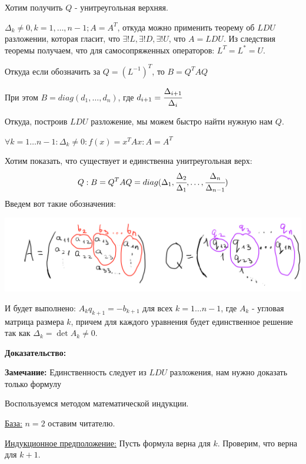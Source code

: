 
Хотим получить $Q$ - унитреугольная верхняя.

$\Delta_k \neq 0 , k = 1,\ldots, n-1; A= A^T$, откуда можно применить теорему об $LDU$ разложении, которая гласит, что $\exists! L, \exists! D, \exists! U$, что $A = LDU$. Из следствия теоремы получаем, что для самосопряженных операторов: $L^T=L^* = U$.

Откуда если обозначить за $Q = (L^{-1})^T$, то $B = Q^T AQ$

При этом  $B = diag(d_1,\ldots,d_n)$, где $d_{i+1} = \cfrac{\Delta_{i+1}}{\Delta_i}$

Откуда, построив $LDU$ разложение, мы можем быстро найти нужную нам $Q$.



$\forall k = 1 \ldots n-1: \Delta_k\neq 0 : f(x) = x^TAx: A = A^T$

Хотим показать, что существует и единственна унитреугольная верх:
$$Q: B = Q^T AQ = diag(\Delta_1, \cfrac{\Delta_2}{\Delta_1},\ldots , \cfrac{\Delta_n}{\Delta_{n-1}})$$
Введем вот такие обозначения:
\begin{center}
   \includegraphics[width = 17cm]{assets/11_2-forms.png}
\end{center}
И будет выполнено: $A_k q_{k+1} = -b_{k+1}$ для всех $k= 1\ldots n-1$, где $A_k$ - угловая матрица размера $k$, причем для каждого уравнения будет единственное решение так как $\Delta_k = \det A_k \neq 0$.

\textbf{Доказательство:}

\textbf{Замечание:} Единственность следует из $LDU$ разложения, нам нужно доказать только формулу

Воспользуемся методом математической индукции.

\uline{База:} $n=2$ оставим читателю.

\uline{Индукционное предположение:} Пусть формула верна для $k$. Проверим, что верна для $k+1$.

